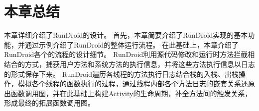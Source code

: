  \section{本章总结}

本章详细介绍了RunDroid的设计。
首先，本章简要介绍了RunDroid实现的基本功能，并通过示例介绍了RunDroid的整体运行流程。
在此基础上，本章介绍了RunDroid各个的流程的设计细节。
RunDroid利用源代码修改和运行时方法拦截相结合的方式，捕获用户方法和系统方法的执行信息，并将这些方法执行信息以日志的形式保存下来。
RunDroid遍历各线程的方法执行日志结合栈的入栈、出栈操作，模拟各个线程的函数执行的过程，通过线程内部各个方法日志的嵌套关系还原出函数调用图，并在此基础上构建Activity的生命周期，补全方法间的触发关系，形成最终的拓展函数调用图。

